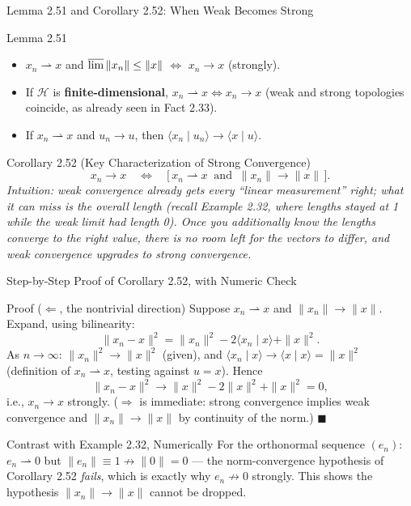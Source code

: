 \documentclass[aspectratio=169,10pt]{beamer}
\newcommand{\Hil}{\mathcal{H}}
\newcommand{\wto}{\rightharpoonup}
\newcommand{\ip}[2]{\langle #1 \mid #2 \rangle}
\begin{document}
\begin{frame}{Lemma 2.51 and Corollary 2.52: When Weak Becomes Strong}
  \begin{block}{Lemma 2.51}
    \begin{itemize}
      \item[(i)] $x_n\wto x$ and $\varlimsup\|x_n\|\le\|x\|$
        $\iff$ $x_n\to x$ (strongly).
      \item[(ii)] If $\Hil$ is \textbf{finite-dimensional}, $x_n\wto x
        \iff x_n\to x$ (weak and strong topologies coincide, as already
        seen in Fact 2.33).
      \item[(iii)] If $x_n\wto x$ and $u_n\to u$, then $\ip{x_n}{u_n}\to
        \ip{x}{u}$.
    \end{itemize}
  \end{block}

  \begin{block}{Corollary 2.52 (Key Characterization of Strong Convergence)}
    \[
      x_n \to x \quad\iff\quad \big[\, x_n\wto x \ \text{ and }\ \|x_n\|\to
      \|x\| \,\big].
    \]
    \textit{Intuition: weak convergence already gets every ``linear
    measurement'' right; what it can miss is the overall length (recall
    Example 2.32, where lengths stayed at 1 while the weak limit had length
    0). Once you additionally know the lengths converge to the right
    value, there is no room left for the vectors to differ, and weak
    convergence upgrades to strong convergence.}
  \end{block}
\end{frame}

\begin{frame}{Step-by-Step Proof of Corollary 2.52, with Numeric Check}
  \begin{block}{Proof ($\Leftarrow$, the nontrivial direction)}
    Suppose $x_n\wto x$ and $\|x_n\|\to\|x\|$. Expand, using bilinearity:
    \[
      \|x_n-x\|^2 = \|x_n\|^2 - 2\ip{x_n}{x} + \|x\|^2.
    \]
    As $n\to\infty$: $\|x_n\|^2\to\|x\|^2$ (given), and $\ip{x_n}{x}\to
    \ip{x}{x}=\|x\|^2$ (definition of $x_n\wto x$, testing against $u=x$).
    Hence
    \[
      \|x_n-x\|^2 \to \|x\|^2 - 2\|x\|^2+\|x\|^2 = 0,
    \]
    i.e., $x_n\to x$ strongly. ($\Rightarrow$ is immediate: strong
    convergence implies weak convergence and $\|x_n\|\to\|x\|$ by
    continuity of the norm.) $\blacksquare$
  \end{block}

  \begin{exampleblock}{Contrast with Example 2.32, Numerically}
    For the orthonormal sequence $(e_n)$: $e_n\wto 0$ but $\|e_n\|\equiv 1
    \not\to \|0\|=0$ --- the norm-convergence hypothesis of Corollary 2.52
    \emph{fails}, which is exactly why $e_n\not\to 0$ strongly. This shows
    the hypothesis $\|x_n\|\to\|x\|$ cannot be dropped.
  \end{exampleblock}
\end{frame}
\end{document}
